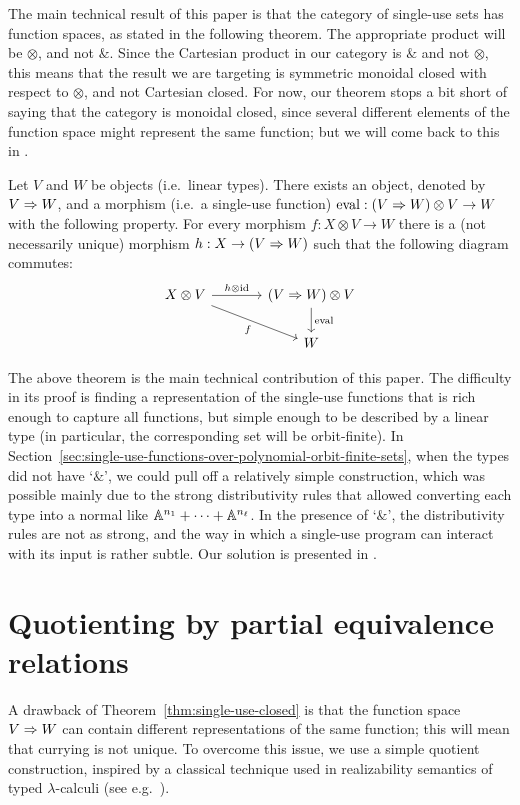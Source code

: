 \documentclass[a4paper,UKenglish,cleveref, autoref, numberwithinsect, thm-restate]{lipics-v2021}
\begin{document}
 
The main technical result of this paper is that the category of single-use sets has function spaces, as stated in the following theorem.  The appropriate product will be $\otimes$, and not $\&$. Since the Cartesian product in our category is $\&$ and not $\otimes$, this means that the result we are targeting is symmetric monoidal closed with respect to $\otimes$, and not Cartesian closed.  For now, our theorem stops a bit short of saying that the category is monoidal closed, since several different elements of the function space might represent the same function; but we will come back to this in .

\begin{theorem}\label{thm:single-use-closed}
    Let $V$ and $W$ be objects (i.e.~linear types). There exists an object, denoted by  $V \Rightarrow W$, and a morphism (i.e.~a single-use function)
    $\mathrm{eval} : (V \Rightarrow W) \otimes V \to  W$
    with the following property. For every morphism
    $f : {X \otimes V} \to  W$
    there is a (not necessarily unique) morphism
    $h :  X \to (V \Rightarrow W)$
    such that the following diagram commutes:
    \[
    \begin{tikzcd}[column sep=large]
    X \otimes V 
    \arrow[r,"h \otimes \mathrm{id}"]
    \arrow[dr,"f"']
    &
    (\funspace V W) \otimes V
    \arrow[d,"\mathrm{eval}"] \\
    &
    W
    \end{tikzcd}
    \]
\end{theorem}

The above theorem is the main technical contribution of this paper. The difficulty in its proof is finding a representation of the single-use  functions that is rich enough to capture all functions, but simple enough to be described by a linear type (in particular, the corresponding set will be orbit-finite). In  Section~\ref{sec:single-use-functions-over-polynomial-orbit-finite-sets}, when the types did not have `$\&$', we could pull off a relatively simple construction, which was possible mainly due to the strong distributivity rules that allowed converting each type into a normal like $\mathbb A^{n_1} + \cdots + \mathbb A^{n_\ell}$. In the presence of `$\&$', the distributivity rules are not as strong, and the way in which a single-use program can interact with its input is rather subtle. 
Our solution is presented in .

\section{Quotienting by partial equivalence relations}
\label{sec:quotient-category}
A drawback of Theorem~\ref{thm:single-use-closed} is that the function space $V \Rightarrow W$ can contain different representations of the same function; this will mean that currying is not unique. To overcome this issue, we use a simple quotient construction, inspired by a classical technique used in realizability semantics of typed $\lambda$-calculi (see e.g.~\cite[Chapter~15]{AmadioCurien}).
\end{document}
